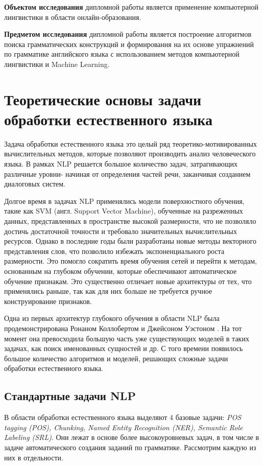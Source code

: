 \textbf{Объектом исследования} дипломной работы является применение компьютерной лингвистики в области онлайн-образования.

\textbf{Предметом исследования} дипломной работы является построение алгоритмов поиска грамматических конструкций и формирования на их основе упражнений по грамматике английского языка с использованием методов компьютерной лингвистики и Machine Learning.

\newpage
\section{Теоретические основы задачи обработки естественного языка}
\label{sec:theory}

Задача обработки естественного языка это целый ряд теоретико-мотивированных вычислительных методов, которые позволяют производить анализ человеческого языка. В рамках NLP решается большое количество задач, затрагивающих различные уровни- начиная от определения частей речи, заканчивая созданием диалоговых систем.

Долгое время в задачах NLP применялись модели поверхностного обучения, такие как SVM (англ. Support Vector Machine), обученные на разреженных данных, представленных в пространстве высокой размерности, что не позволяло достичь достаточной точности и требовало значительных вычислительных ресурсов. Однако в последние годы были разработаны новые методы векторного представления слов, что позволило избежать экспоненциального роста размерности. Это помогло сократить время обучения сетей и перейти к методам, основанным на глубоком обучении, которые обеспечивают автоматическое обучение признакам. Это существенно отличает новые архитектуры от тех, что применялись раньше, так как для них больше не требуется ручное конструирование признаков.

Одна из первых архитектур глубокого обучения в области NLP была продемонстрирована Ронаном Коллобертом и Джейсоном Уэстоном \autocite{DBLP:journals/corr/abs-1103-0398}. На тот момент она превосходила большую часть уже существующих моделей в таких задачах, как поиск именованных сущностей и др. С того времени появилось большое количество алгоритмов и моделей, решающих сложные задачи обработки естественного языка.

\subsection{Стандартные задачи NLP}
\label{subsec:standard}
В области обработки естественного языка выделяют 4 базовые задачи:\emph{ POS tagging (POS), Chunking, Named Entity Recognition (NER), Semantic Role Labeling (SRL)}. Они лежат в основе более высокоуровневых задач, в том числе в задаче автоматического создания заданий по грамматике. Рассмотрим каждую из них в отдельности.
